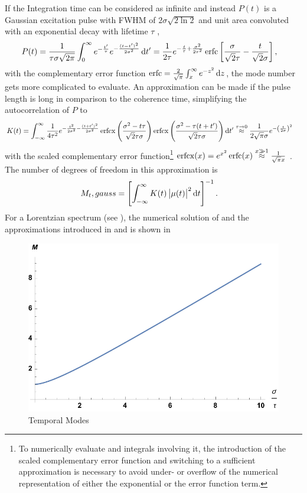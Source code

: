 If the Integration time can be considered as infinite and instead $P(t)$ is a Gaussian excitation pulse with FWHM of $2\sigma\sqrt{2\ln2}$ and unit area convoluted with an exponential decay with lifetime $\tau$ \cite{butz2015},
\begin{align}
P(t)&=\frac{1}{\tau\sigma\sqrt{2\pi}} \int_0^{\infty} e^{-\frac{t^{\prime}}{\tau}} 
e^{-\frac{(t-t^{\prime})^2}{2\sigma^2}}\operatorname{\mathrm{d}\!} t^{\prime}
=\frac{1}{2\tau}e^{-\frac{t}{\tau}+\frac{\sigma^2}{2\tau^2}}
\operatorname{erfc}\left[
\frac{\sigma}{\sqrt{2}\tau}
-\frac{t}{\sqrt{2}\sigma}
	\right] ,
	\label{eq:pfull}
	\end{align}
	with the complementary error function $\operatorname{erfc}=\frac{2}{\sqrt{\pi}}\int_x^\infty e^{-z^2}\operatorname{\mathrm{d}\!} z$, the mode number gets more complicated to evaluate. An approximation can be made if the pulse length is long in comparison to the coherence time, simplifying the autocorrelation of $P$ to
\begin{align}
K(t)=\int_{-\infty}^\infty \frac{1}{4
	\tau ^2}e^{-\frac{t^2}{2 \sigma ^2}-\frac{(t+t')^2}{2 \sigma ^2}}
\operatorname{erfcx}\left(\frac{\sigma^2 -t \tau }{\sqrt{2} \tau \sigma}\right)
\operatorname{erfcx}\left(\frac{\sigma^2 -\tau  (t+t')}{\sqrt{2} \tau \sigma }\right) \operatorname{\mathrm{d}\!} t'&\stackrel{\tau \rightarrow 0}{\approx} \frac{1}{2\sqrt{\pi}\sigma} e^{-\left(\frac{t}{2\sigma}\right)^2} 
\end{align}
with the scaled complementary error function\footnote{To numerically evaluate  and integrals involving it, the introduction of the scaled complementary error function  and switching to a sufficient approximation is necessary to avoid under- or overflow of the numerical representation of either the exponential or the error function term.} $\operatorname{erfcx}(x)=e^{x^2}\operatorname{erfc}(x)\stackrel{x\gg1}{\approx}  \frac{1}{\sqrt{\pi}x}$
   \cite{ren2007}.
The number of degrees of freedom in this approximation is
\begin{align}
M_t,gauss&=\left[\int_{-\infty}^{\infty} K(t) \left|\mu(t)\right|^2\operatorname{\mathrm{d}\!} t\right]^{-1}.
\label{eq:modesapprox2}
\end{align}
For a Lorentzian spectrum (see ), the numerical solution of  and the approximations introduced in  and  is shown in  

\begin{figure}
	\centering
	\includegraphics[width=0.5\linewidth]{images/modes_plot.pdf}
	\caption{Temporal Modes}
	\label{fig:modes}
\end{figure}

